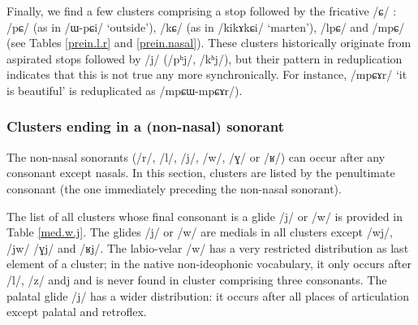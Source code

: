 \documentclass[oldfontcommands,oneside,a4paper,11pt]{article}
\newcommand{\ipa}[1]{/#1/} %
\begin{document}
Finally, we find a few clusters comprising a stop followed by the fricative \ipa{ɕ} :  \ipa{pɕ}  (as in \ipa{ɯ-pɕi}  `outside'),  \ipa{kɕ}  (as in \ipa{kikɤkɕi}  `marten'), \ipa{lpɕ} and \ipa{mpɕ} (see Tables \ref{prein.l.r} and  \ref{prein.nasal}). These clusters historically originate from aspirated stops followed by \ipa{j} (\ipa{pʰj}, \ipa{kʰj}), but their pattern in reduplication indicates that this is not true any more synchronically. For instance, \ipa{mpɕɤr} `it is beautiful' is reduplicated as \ipa{mpɕɯ-mpɕɤr}).

 \subsubsection{Clusters ending in a (non-nasal) sonorant}   \label{sec:medial}
  The non-nasal sonorants (\ipa{r}, \ipa{l}, \ipa{j}, \ipa{w}, \ipa{ɣ} or \ipa{ʁ}) can occur after any consonant except nasals. In this section, clusters are listed by the penultimate consonant  (the one immediately preceding the non-nasal sonorant).  
  
  
  
  The list of all clusters whose final consonant is a glide  \ipa{j} or \ipa{w} is provided in Table \ref{med.w.j}. The glides  \ipa{j} or \ipa{w} are medials in all clusters except \ipa{wj}, \ipa{jw} \ipa{ɣj} and \ipa{ʁj}. The labio-velar \ipa{w} has a very restricted distribution as last element of a cluster; in the native non-ideophonic vocabulary, it only occurs after \ipa{l}, \ipa{z} and{j} and is never found in cluster comprising three consonants. The palatal glide \ipa{j} has a wider distribution: it occurs after all places of articulation except palatal and retroflex.
  
  
  
\end{document}
